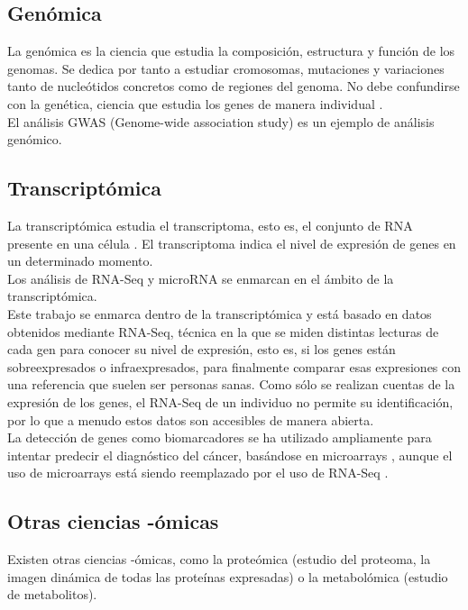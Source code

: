 \subsection{Genómica}

La genómica es la ciencia que estudia la composición, estructura y función de los genomas. Se dedica por tanto a estudiar cromosomas, mutaciones y variaciones tanto de nucleótidos concretos como de regiones del genoma. No debe confundirse con la genética, ciencia que estudia los genes de manera individual \cite{Pierce2010}.\\

El análisis GWAS (Genome-wide association study) es un ejemplo de análisis genómico.

\subsection{Transcriptómica}

La transcriptómica estudia el transcriptoma, esto es, el conjunto de RNA presente en una célula \cite{Milward2016}. El transcriptoma indica el nivel de expresión de genes en un determinado momento.\\

Los análisis de RNA-Seq y microRNA se enmarcan en el ámbito de la transcriptómica.\\

Este trabajo se enmarca dentro de la transcriptómica y está basado en datos obtenidos mediante RNA-Seq, técnica en la que se miden distintas lecturas de cada gen para conocer su nivel de expresión, esto es, si los genes están sobreexpresados o infraexpresados, para finalmente comparar esas expresiones con una referencia que suelen ser personas sanas. Como sólo se realizan cuentas de la expresión de los genes, el RNA-Seq de un individuo no permite su identificación, por lo que a menudo estos datos son accesibles de manera abierta.\\

La detección de genes como biomarcadores se ha utilizado ampliamente para intentar predecir el diagnóstico del cáncer, basándose en microarrays \cite{Lee2008, Maglietta2007}, aunque el uso de microarrays está siendo reemplazado por el uso de RNA-Seq  \cite{Stark2019, VanVerk2013}.

\subsection{Otras ciencias -ómicas}

Existen otras ciencias -ómicas, como la proteómica (estudio del proteoma, la imagen dinámica de todas las proteínas expresadas) o la metabolómica (estudio de metabolitos).
